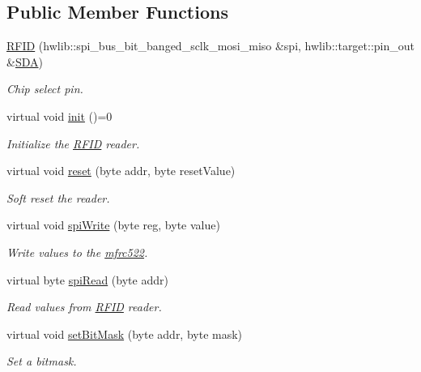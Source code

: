\subsection*{Public Member Functions}
\begin{DoxyCompactItemize}
\item 
\hyperlink{class_r_f_i_d_ad893852fc8a7c6a975a42cf3db951857}{R\+F\+ID} (hwlib\+::spi\+\_\+bus\+\_\+bit\+\_\+banged\+\_\+sclk\+\_\+mosi\+\_\+miso \&spi, hwlib\+::target\+::pin\+\_\+out \&\hyperlink{class_r_f_i_d_a4367d5ca78409b651a56920886e8fac2}{S\+DA})
\begin{DoxyCompactList}\small\item\em Chip select pin. \end{DoxyCompactList}\item 
virtual void \hyperlink{class_r_f_i_d_a8b244d38edcafaeb06637dbf33b5656f}{init} ()=0
\begin{DoxyCompactList}\small\item\em Initialize the \hyperlink{class_r_f_i_d}{R\+F\+ID} reader. \end{DoxyCompactList}\item 
virtual void \hyperlink{class_r_f_i_d_a3f1242db1a6bb7b57d6bfb7111d1fadd}{reset} (byte addr, byte reset\+Value)
\begin{DoxyCompactList}\small\item\em Soft reset the reader. \end{DoxyCompactList}\item 
virtual void \hyperlink{class_r_f_i_d_a44da5195bf18d4882f1b691904e993b6}{spi\+Write} (byte reg, byte value)
\begin{DoxyCompactList}\small\item\em Write values to the \hyperlink{classmfrc522}{mfrc522}. \end{DoxyCompactList}\item 
virtual byte \hyperlink{class_r_f_i_d_ac9d2c7f3589feef21aba37a95354c6c2}{spi\+Read} (byte addr)
\begin{DoxyCompactList}\small\item\em Read values from \hyperlink{class_r_f_i_d}{R\+F\+ID} reader. \end{DoxyCompactList}\item 
virtual void \hyperlink{class_r_f_i_d_af8a78df3f2b79c1ffc8ea660693f43ec}{set\+Bit\+Mask} (byte addr, byte mask)
\begin{DoxyCompactList}\small\item\em Set a bitmask. \end{DoxyCompactList}\item 

\end{DoxyCompactItemize}
